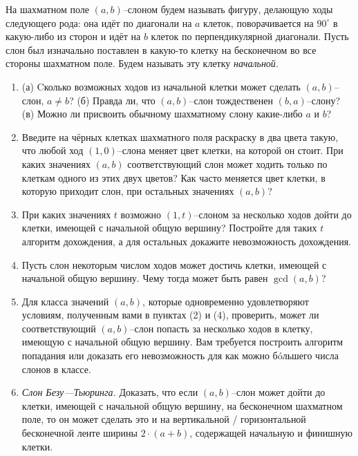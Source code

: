 \vspace{-0.35cm} 

\ms На шахматном поле $(a,b)$--слоном будем называть фигуру, делающую ходы следующего рода: она идёт по диагонали на $a$ клеток, поворачивается на $90^{\circ}$ в какую-либо из сторон и идёт на $b$ клеток по перпендикулярной диагонали. Пусть слон был изначально поставлен в какую-то клетку на бесконечном во все стороны шахматном поле. Будем называть эту клетку {\it начальной}.

\begin{enumerate}

\item (а) Cколько возможных ходов из начальной клетки может сделать $(a,b)$--слон, $a \ne b$? (б) Правда ли, что $(a,b)$--слон тождественен $(b,a)$--слону? (в) Можно ли присвоить обычному шахматному слону какие-либо $a$ и $b$?

\item Введите на чёрных клетках шахматного поля раскраску в два цвета такую, что любой ход $(1,0)$--слона меняет цвет клетки, на которой он стоит. При каких значениях $(a,b)$ соответствующий слон может ходить только по клеткам одного из этих двух цветов? Как часто меняется цвет клетки, в которую приходит слон, при остальных значениях $(a,b)$?

\item При каких значениях $t$ возможно $(1,t)$--слоном за несколько ходов дойти до клетки, имеющей с начальной общую вершину? Постройте для таких $t$ алгоритм дохождения, а для остальных докажите невозможность дохождения.

\item Пусть слон некоторым числом ходов может достичь клетки, имеющей с начальной общую вершину. Чему тогда может быть равен $\gcd (a,b)$?

\item Для класса значений $(a,b)$, которые одновременно удовлетворяют условиям, полученным вами в пунктах (2) и (4), проверить, может ли соответствующий $(a,b)$--слон попасть за несколько ходов в клетку, имеющую с начальной общую вершину. Вам требуется построить алгоритм попадания или доказать его невозможность для как можно б\'oльшего числа слонов в классе.

\item {\it Слон Безу---Тьюринга.} Доказать, что если $(a,b)$--слон может дойти до клетки, имеющей с начальной общую вершину, на бесконечном шахматном поле, то он может сделать это и на вертикальной / горизонтальной бесконечной ленте ширины $2\cdot(a+b)$, содержащей начальную и финишную клетки.


\end{enumerate}
